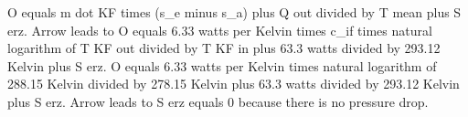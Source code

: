 O equals m dot KF times (s_e minus s_a) plus Q out divided by T mean plus S erz.  
Arrow leads to O equals 6.33 watts per Kelvin times c_if times natural logarithm of T KF out divided by T KF in plus 63.3 watts divided by 293.12 Kelvin plus S erz.  
O equals 6.33 watts per Kelvin times natural logarithm of 288.15 Kelvin divided by 278.15 Kelvin plus 63.3 watts divided by 293.12 Kelvin plus S erz.  
Arrow leads to S erz equals 0 because there is no pressure drop.